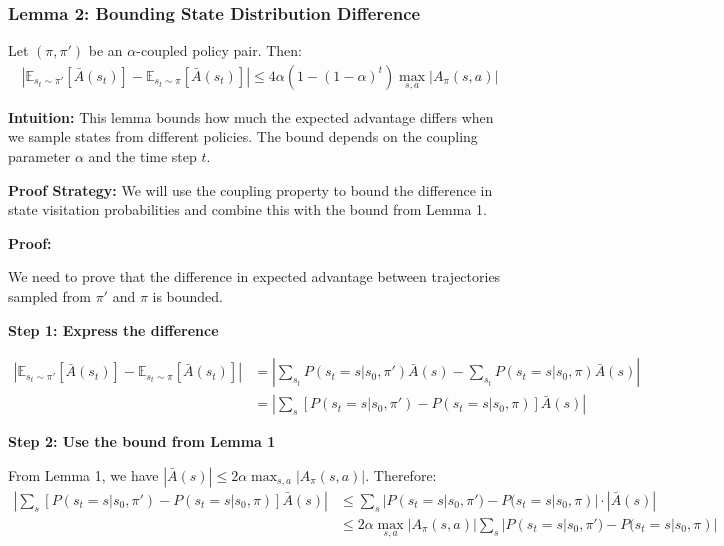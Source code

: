 \subsubsection{Lemma 2: Bounding State Distribution Difference}

\begin{lemma}
    Let $(\pi, \pi')$ be an $\alpha$-coupled policy pair. Then:
    \begin{align*}
        |\mathbb{E}_{s_t \sim \pi'}[\bar{A}(s_t)] - \mathbb{E}_{s_t \sim \pi}[\bar{A}(s_t)]| \le 4\alpha(1-(1-\alpha)^t)\max_{s, a}|A_\pi(s, a)|
    \end{align*}
\end{lemma}

\textbf{Intuition:}
This lemma bounds how much the expected advantage differs when we sample states from different policies. The bound depends on the coupling parameter $\alpha$ and the time step $t$.

\textbf{Proof Strategy:}
We will use the coupling property to bound the difference in state visitation probabilities and combine this with the bound from Lemma 1.

\textbf{Proof:}

We need to prove that the difference in expected advantage between trajectories sampled from $\pi'$ and $\pi$ is bounded.

\textbf{Step 1: Express the difference}

\begin{align}
|\mathbb{E}_{s_t \sim \pi'}[\bar{A}(s_t)] - \mathbb{E}_{s_t \sim \pi}[\bar{A}(s_t)]| &= \left| \sum_{s_t} P(s_t = s | s_0, \pi') \bar{A}(s) - \sum_{s_t} P(s_t = s | s_0, \pi) \bar{A}(s) \right| \\
&= \left| \sum_{s} [P(s_t = s | s_0, \pi') - P(s_t = s | s_0, \pi)] \bar{A}(s) \right|
\end{align}

\textbf{Step 2: Use the bound from Lemma 1}

From Lemma 1, we have $|\bar{A}(s)| \le 2\alpha \max_{s, a}|A_{\pi}(s,a)|$. Therefore:
\begin{align}
\left| \sum_{s} [P(s_t = s | s_0, \pi') - P(s_t = s | s_0, \pi)] \bar{A}(s) \right| &\le \sum_{s} |P(s_t = s | s_0, \pi') - P(s_t = s | s_0, \pi)| \cdot |\bar{A}(s)| \\
&\le 2\alpha \max_{s, a}|A_{\pi}(s,a)| \sum_{s} |P(s_t = s | s_0, \pi') - P(s_t = s | s_0, \pi)|
\end{align}


